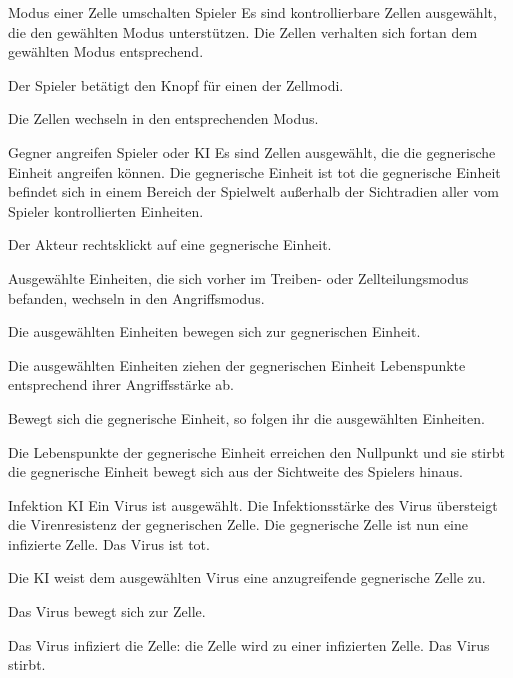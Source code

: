 \actionentry
{Modus einer Zelle umschalten}
{Spieler}
{
  Es sind kontrollierbare Zellen ausgewählt, die den gewählten Modus
  unterstützen.
}
{Die Zellen verhalten sich fortan dem gewählten Modus entsprechend.}
{
  \begin{compactenum}
    \item Der Spieler betätigt den Knopf für einen der Zellmodi.
    \item Die Zellen wechseln in den entsprechenden Modus.
  \end{compactenum}
}

\actionentry
{Gegner angreifen}
{Spieler oder KI}
{Es sind Zellen ausgewählt, die die gegnerische Einheit angreifen können.}
{
  Die gegnerische Einheit ist tot \oder die gegnerische Einheit befindet
  sich in einem Bereich der Spielwelt außerhalb der Sichtradien aller
  vom Spieler kontrollierten Einheiten.
}
{
  \begin{compactenum}
    \item Der Akteur rechtsklickt auf eine gegnerische Einheit.
    \item Ausgewählte Einheiten, die sich vorher im Treiben- oder
      Zellteilungsmodus befanden, wechseln in den Angriffsmodus.
    \item Die ausgewählten Einheiten bewegen sich zur gegnerischen Einheit.
    \item Die ausgewählten Einheiten ziehen der gegnerischen Einheit
      Lebenspunkte entsprechend ihrer Angriffsstärke ab.
    \item Bewegt sich die gegnerische Einheit, so folgen ihr die ausgewählten
      Einheiten.
    \item Die Lebenspunkte der gegnerische Einheit erreichen den Nullpunkt
      und sie stirbt \oder die gegnerische Einheit bewegt sich aus der
      Sichtweite des Spielers hinaus.
  \end{compactenum}
}

\actionentry
{Infektion}
{KI}
{
  Ein Virus ist ausgewählt. Die Infektionsstärke des Virus übersteigt die
  Virenresistenz der gegnerischen Zelle.
}
{
  Die gegnerische Zelle ist nun eine infizierte Zelle. Das Virus ist
  tot.
}
{
  \begin{compactenum}
    \item Die KI weist dem ausgewählten Virus eine anzugreifende gegnerische
      Zelle zu.
    \item Das Virus bewegt sich zur Zelle.
    \item Das Virus infiziert die Zelle: die Zelle wird zu einer infizierten
      Zelle. Das Virus stirbt.
  \end{compactenum}
}

